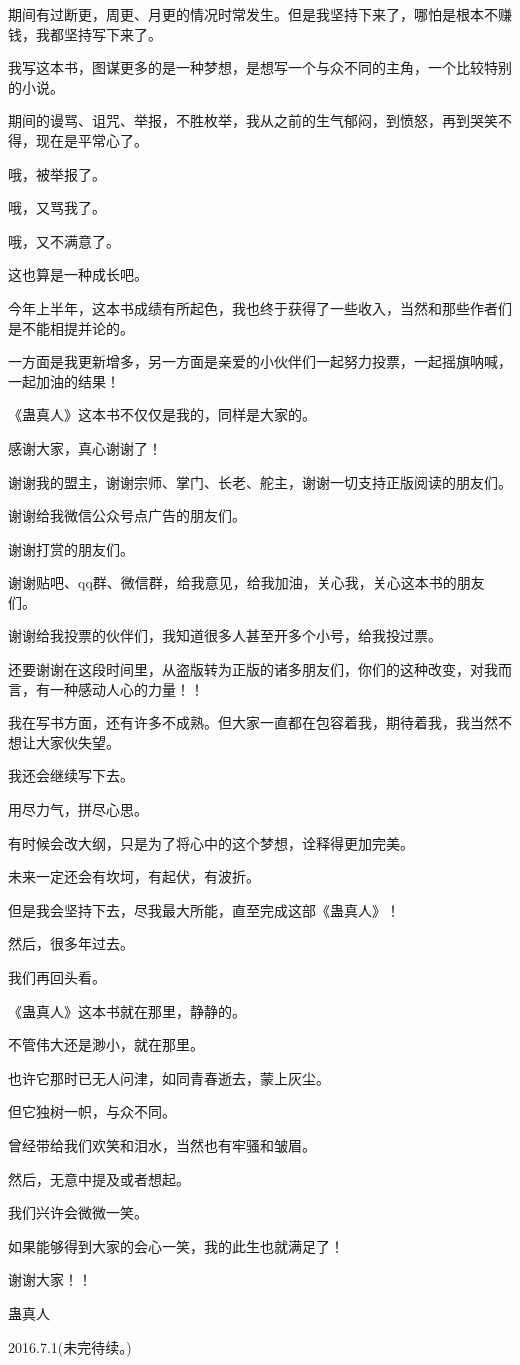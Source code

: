\begin{this_body}
期间有过断更，周更、月更的情况时常发生。但是我坚持下来了，哪怕是根本不赚钱，我都坚持写下来了。

我写这本书，图谋更多的是一种梦想，是想写一个与众不同的主角，一个比较特别的小说。

期间的谩骂、诅咒、举报，不胜枚举，我从之前的生气郁闷，到愤怒，再到哭笑不得，现在是平常心了。

哦，被举报了。

哦，又骂我了。

哦，又不满意了。

这也算是一种成长吧。

今年上半年，这本书成绩有所起色，我也终于获得了一些收入，当然和那些作者们是不能相提并论的。

一方面是我更新增多，另一方面是亲爱的小伙伴们一起努力投票，一起摇旗呐喊，一起加油的结果！

《蛊真人》这本书不仅仅是我的，同样是大家的。

感谢大家，真心谢谢了！

谢谢我的盟主，谢谢宗师、掌门、长老、舵主，谢谢一切支持正版阅读的朋友们。

谢谢给我微信公众号点广告的朋友们。

谢谢打赏的朋友们。

谢谢贴吧、qq群、微信群，给我意见，给我加油，关心我，关心这本书的朋友们。

谢谢给我投票的伙伴们，我知道很多人甚至开多个小号，给我投过票。

还要谢谢在这段时间里，从盗版转为正版的诸多朋友们，你们的这种改变，对我而言，有一种感动人心的力量！！

我在写书方面，还有许多不成熟。但大家一直都在包容着我，期待着我，我当然不想让大家伙失望。

我还会继续写下去。

用尽力气，拼尽心思。

有时候会改大纲，只是为了将心中的这个梦想，诠释得更加完美。

未来一定还会有坎坷，有起伏，有波折。

但是我会坚持下去，尽我最大所能，直至完成这部《蛊真人》！

然后，很多年过去。

我们再回头看。

《蛊真人》这本书就在那里，静静的。

不管伟大还是渺小，就在那里。

也许它那时已无人问津，如同青春逝去，蒙上灰尘。

但它独树一帜，与众不同。

曾经带给我们欢笑和泪水，当然也有牢骚和皱眉。

然后，无意中提及或者想起。

我们兴许会微微一笑。

如果能够得到大家的会心一笑，我的此生也就满足了！

谢谢大家！！

蛊真人

2016.7.1(未完待续。)

\end{this_body}

